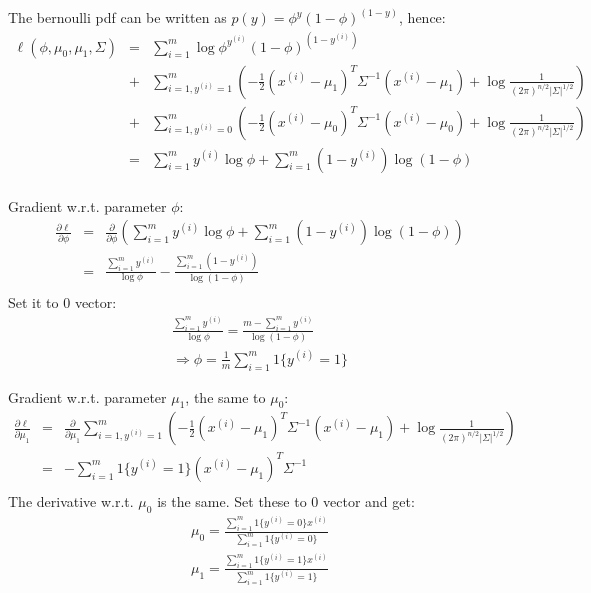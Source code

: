 \begin{answer}

The bernoulli pdf can be written as $p(y) = \phi^y (1-\phi)^{(1-y)}$, hence:
\begin{eqnarray*}
\ell(\phi, \mu_{0}, \mu_1, \Sigma) 
	&=& \sum_{i=1}^m \log \phi^{y^{(i)}} (1-\phi)^{(1-y^{(i)})} \\
	&+& \sum_{i=1,y^{(i)}=1}^m \left( -\frac{1}{2}(x^{(i)}-\mu_1)^T \Sigma^{-1} (x^{(i)}-\mu_1) + \log {\frac{1}{(2\pi)^{n/2} |\Sigma|^{1/2}} }\right )\\
	&+& \sum_{i=1,y^{(i)}=0}^m \left( -\frac{1}{2}(x^{(i)}-\mu_0)^T \Sigma^{-1} (x^{(i)}-\mu_0) + \log {\frac{1}{(2\pi)^{n/2} |\Sigma|^{1/2}} }\right )\\
	&=& \sum_{i=1}^m y^{(i)} \log \phi + \sum_{i=1}^m (1-y^{(i)}) \log (1-\phi) \\
\end{eqnarray*}

Gradient w.r.t. parameter $\phi$:
\begin{eqnarray*}
\frac{\partial \ell}{\partial \phi}
	&=& \frac{\partial}{\partial \phi} \left (\sum_{i=1}^m y^{(i)} \log \phi + \sum_{i=1}^m (1-y^{(i)}) \log (1-\phi) \right)\\
	&=& \frac{\sum_{i=1}^m y^{(i)}}{\log \phi} - \frac{\sum_{i=1}^m (1-y^{(i)})}{\log (1-\phi)} \\
\end{eqnarray*}
Set it to 0 vector:
\begin{eqnarray*}
	\frac{\sum_{i=1}^m y^{(i)}}{\log \phi} = \frac{m- \sum_{i=1}^m y^{(i)}} {\log (1-\phi)} \\
	\Rightarrow \phi = \frac{1}{m} \sum_{i=1}^m 1\{y^{(i)} = 1\}
\end{eqnarray*}

Gradient w.r.t. parameter $\mu_1$, the same to $\mu_0$:
\begin{eqnarray*}
\frac{\partial \ell}{\partial \mu_1}
	&=& \frac{\partial}{\partial \mu_1} \sum_{i=1,y^{(i)}=1}^m \left( -\frac{1}{2}(x^{(i)}-\mu_1)^T \Sigma^{-1} (x^{(i)}-\mu_1) 
		+ \log {\frac{1}{(2\pi)^{n/2} |\Sigma|^{1/2}} }\right ) \\
	&=& -\sum_{i=1}^m 1\{y^{(i)}=1\}(x^{(i)}-\mu_1)^T \Sigma^{-1} \\
\end{eqnarray*}
The derivative w.r.t. $\mu_0$ is the same. Set these to 0 vector and get:
\begin{eqnarray*}
	\mu_0 = \frac{\sum_{i=1}^m 1\{y^{(i)} = 0\} x^{(i)}}{\sum_{i=1}^m 1\{y^{(i)} = 0\}} \\
	\mu_1 = \frac{\sum_{i=1}^m 1\{y^{(i)} = 1\} x^{(i)}}{\sum_{i=1}^m 1\{y^{(i)} = 1\}}
\end{eqnarray*}


\end{answer}
